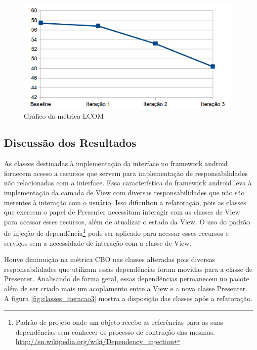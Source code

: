 \documentclass[conference]{IEEEtran}
\begin{document}
\begin{figure}[!htb]
	\begin{center}
		\includegraphics[scale=0.35]{img/lcom.png}
	\end{center}
	\caption{\label{fig:lcom} Gráfico da métrica LCOM}   
	
\end{figure}



\subsection{Discussão dos Resultados} 




As classes destinadas à implementação da interface no framework android fornecem
acesso a recursos que servem para implementação de responsabilidades não
relacionadas com a interface. Essa característica do framework android leva à
implementação da camada de View com diversas responsabilidades que não são
inerentes à interação com o usuário. Isso dificultou a refatoração, pois as
classes que exercem o papel de Presenter necessitam interagir com as classes de
View para acessar esses recursos, além de atualizar o estado da View. O uso do
padrão de injeção de
dependência\footnote{Padrão
de projeto onde um objeto recebe as referências para as suas dependências sem
conhecer os processo de contrução das mesmas.
\url{http://en.wikipedia.org/wiki/Dependency_injection}}
pode ser aplicado para acessar esses recursos e serviços sem a necessidade de
interação com a classe de View.

Houve diminuição na métrica CBO nas classes alteradas pois diversas
responsabilidades que utilizam essas dependências foram movidas para a classe de
Presenter. Analisando de forma geral, essas dependências permanecem no pacote
além de ser criado mais um acoplamento entre a View e a nova classe Presenter.
A figura \ref{fig:classes_iteracao3} mostra a disposição das classes após a
refatoração.
\end{document}
